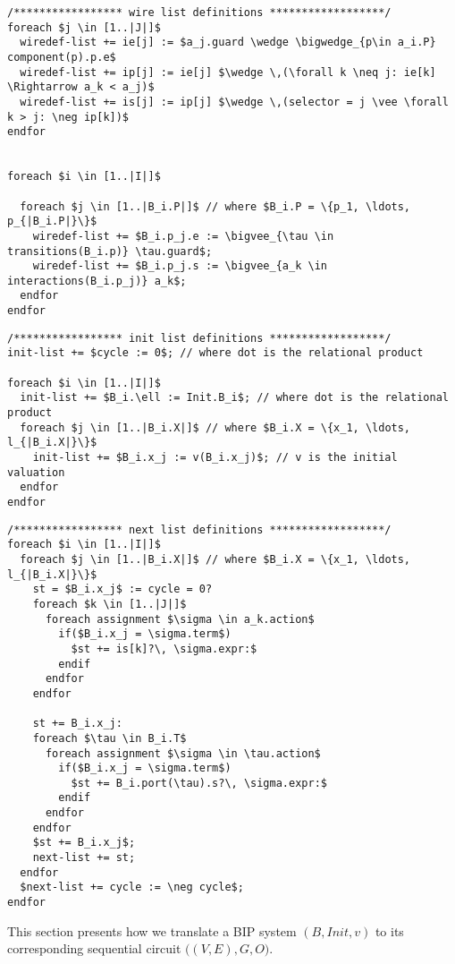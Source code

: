 \begin{lstlisting}
/***************** wire list definitions ******************/
foreach $j \in [1..|J|]$
  wiredef-list += ie[j] := $a_j.guard \wedge \bigwedge_{p\in a_i.P} component(p).p.e$ 
  wiredef-list += ip[j] := ie[j] $\wedge \,(\forall k \neq j: ie[k] \Rightarrow a_k < a_j)$ 
  wiredef-list += is[j] := ip[j] $\wedge \,(selector = j \vee \forall k > j: \neg ip[k])$   
endfor


foreach $i \in [1..|I|]$

  foreach $j \in [1..|B_i.P|]$ // where $B_i.P = \{p_1, \ldots, p_{|B_i.P|}\}$ 
    wiredef-list += $B_i.p_j.e := \bigvee_{\tau \in transitions(B_i.p)} \tau.guard$; 
    wiredef-list += $B_i.p_j.s := \bigvee_{a_k \in interactions(B_i.p_j)} a_k$; 
  endfor 
endfor
\end{lstlisting}

\begin{lstlisting}
/***************** init list definitions ******************/
init-list += $cycle := 0$; // where dot is the relational product

foreach $i \in [1..|I|]$
  init-list += $B_i.\ell := Init.B_i$; // where dot is the relational product
  foreach $j \in [1..|B_i.X|]$ // where $B_i.X = \{x_1, \ldots, l_{|B_i.X|}\}$ 
    init-list += $B_i.x_j := v(B_i.x_j)$; // v is the initial valuation
  endfor 
endfor
\end{lstlisting}


\begin{lstlisting}
/***************** next list definitions ******************/
foreach $i \in [1..|I|]$
  foreach $j \in [1..|B_i.X|]$ // where $B_i.X = \{x_1, \ldots, l_{|B_i.X|}\}$ 
    st = $B_i.x_j$ := cycle = 0?
    foreach $k \in [1..|J|]$
      foreach assignment $\sigma \in a_k.action$
        if($B_i.x_j = \sigma.term$)
          $st += is[k]?\, \sigma.expr:$
        endif
      endfor
    endfor
    
    st += B_i.x_j:  
    foreach $\tau \in B_i.T$ 
      foreach assignment $\sigma \in \tau.action$
        if($B_i.x_j = \sigma.term$)
          $st += B_i.port(\tau).s?\, \sigma.expr:$
        endif
      endfor
    endfor      
    $st += B_i.x_j$; 
    next-list += st;  
  endfor
  $next-list += cycle := \neg cycle$; 
endfor
\end{lstlisting}

This section presents how we translate a BIP system $(B,\mathit{Init}, v)$ to its corresponding sequential circuit  $\big( (V, E),G, O\big)$. 


